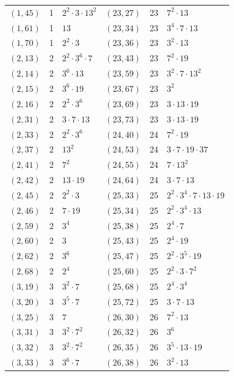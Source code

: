 \documentclass[11pt]{article}
\begin{document}
\begin{longtable}{@{}lrl@{\qquad}lrl@{}}
$(1,45)$ & 1 & $2^{2}\cdot 3\cdot 13^{2}$ & $(23,27)$ & 23 & $7^{2}\cdot 13$\\
$(1,61)$ & 1 & $13$ & $(23,34)$ & 23 & $3^{4}\cdot 7\cdot 13$\\
$(1,70)$ & 1 & $2^{2}\cdot 3$ & $(23,36)$ & 23 & $3^{2}\cdot 13$\\
$(2,13)$ & 2 & $2^{2}\cdot 3^{6}\cdot 7$ & $(23,43)$ & 23 & $7^{2}\cdot 19$\\
$(2,14)$ & 2 & $3^{6}\cdot 13$ & $(23,59)$ & 23 & $3^{2}\cdot 7\cdot 13^{2}$\\
$(2,15)$ & 2 & $3^{6}\cdot 19$ & $(23,67)$ & 23 & $3^{2}$\\
$(2,16)$ & 2 & $2^{2}\cdot 3^{6}$ & $(23,69)$ & 23 & $3\cdot 13\cdot 19$\\
$(2,31)$ & 2 & $3\cdot 7\cdot 13$ & $(23,73)$ & 23 & $3\cdot 13\cdot 19$\\
$(2,33)$ & 2 & $2^{2}\cdot 3^{6}$ & $(24,40)$ & 24 & $7^{2}\cdot 19$\\
$(2,37)$ & 2 & $13^{2}$ & $(24,53)$ & 24 & $3\cdot 7\cdot 19\cdot 37$\\
$(2,41)$ & 2 & $7^{2}$ & $(24,55)$ & 24 & $7\cdot 13^{2}$\\
$(2,42)$ & 2 & $13\cdot 19$ & $(24,64)$ & 24 & $3\cdot 7\cdot 13$\\
$(2,45)$ & 2 & $2^{2}\cdot 3$ & $(25,33)$ & 25 & $2^{2}\cdot 3^{4}\cdot 7\cdot 13\cdot 19$\\
$(2,46)$ & 2 & $7\cdot 19$ & $(25,34)$ & 25 & $2^{2}\cdot 3^{4}\cdot 13$\\
$(2,59)$ & 2 & $3^{4}$ & $(25,38)$ & 25 & $2^{4}\cdot 7$\\
$(2,60)$ & 2 & $3$ & $(25,43)$ & 25 & $2^{4}\cdot 19$\\
$(2,62)$ & 2 & $3^{6}$ & $(25,47)$ & 25 & $2^{2}\cdot 3^{5}\cdot 19$\\
$(2,68)$ & 2 & $2^{4}$ & $(25,60)$ & 25 & $2^{2}\cdot 3\cdot 7^{2}$\\
$(3,19)$ & 3 & $3^{2}\cdot 7$ & $(25,68)$ & 25 & $2^{4}\cdot 3^{4}$\\
$(3,20)$ & 3 & $3^{5}\cdot 7$ & $(25,72)$ & 25 & $3\cdot 7\cdot 13$\\
$(3,25)$ & 3 & $7$ & $(26,30)$ & 26 & $7^{2}\cdot 13$\\
$(3,31)$ & 3 & $3^{2}\cdot 7^{2}$ & $(26,32)$ & 26 & $3^{6}$\\
$(3,32)$ & 3 & $3^{2}\cdot 7^{2}$ & $(26,35)$ & 26 & $3^{5}\cdot 13\cdot 19$\\
$(3,33)$ & 3 & $3^{6}\cdot 7$ & $(26,38)$ & 26 & $3^{2}\cdot 13$\\

\end{longtable}
\end{document}
